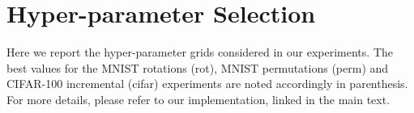 % 
% 
% 
% 
% 
% 
% 

\section{Hyper-parameter Selection} \label{sec:apphyper}
Here we report the hyper-parameter grids considered in our experiments. The
best values for the MNIST rotations (rot), MNIST permutations (perm) and
CIFAR-100 incremental (cifar) experiments are noted accordingly in parenthesis.
For more details, please refer to our implementation, linked in the main text.
